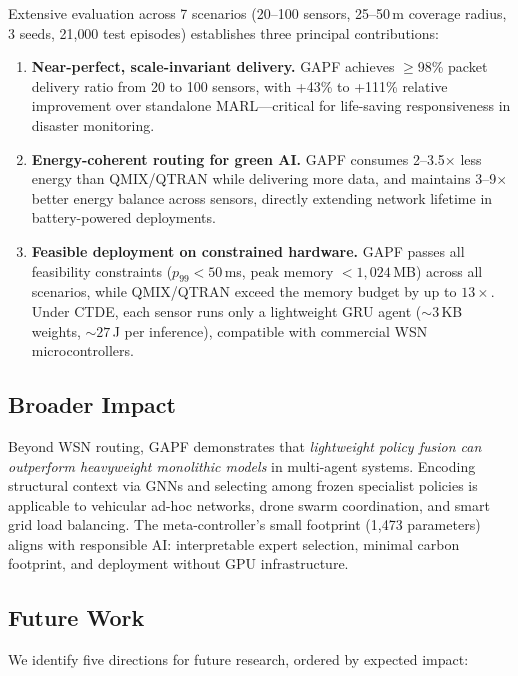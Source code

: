\documentclass[12pt, onecolumn, journal]{IEEEtran}
\begin{document}
Extensive evaluation across 7 scenarios (20--100 sensors, 25--50\,m coverage radius, 3 seeds, 21{,}000 test episodes) establishes three principal contributions:

\begin{enumerate}
    \item \textbf{Near-perfect, scale-invariant delivery.} GAPF achieves $\geq$98\% packet delivery ratio from 20 to 100 sensors, with +43\% to +111\% relative improvement over standalone MARL---critical for life-saving responsiveness in disaster monitoring.
    
    \item \textbf{Energy-coherent routing for green AI.} GAPF consumes 2--3.5$\times$ less energy than QMIX/QTRAN while delivering more data, and maintains 3--9$\times$ better energy balance across sensors, directly extending network lifetime in battery-powered deployments.
    
    \item \textbf{Feasible deployment on constrained hardware.} GAPF passes all feasibility constraints ($p_{99} < 50$\,ms, peak memory $< 1{,}024$\,MB) across all scenarios, while QMIX/QTRAN exceed the memory budget by up to $13\times$. Under CTDE, each sensor runs only a lightweight GRU agent (${\sim}3$\,KB weights, ${\sim}27$\,\textmu J per inference), compatible with commercial WSN microcontrollers.
\end{enumerate}

\subsection{Broader Impact}

Beyond WSN routing, GAPF demonstrates that \emph{lightweight policy fusion can outperform heavyweight monolithic models} in multi-agent systems. Encoding structural context via GNNs and selecting among frozen specialist policies is applicable to vehicular ad-hoc networks, drone swarm coordination, and smart grid load balancing. The meta-controller's small footprint (1{,}473 parameters) aligns with responsible AI: interpretable expert selection, minimal carbon footprint, and deployment without GPU infrastructure.

\subsection{Future Work}

We identify five directions for future research, ordered by expected impact:
\end{document}
